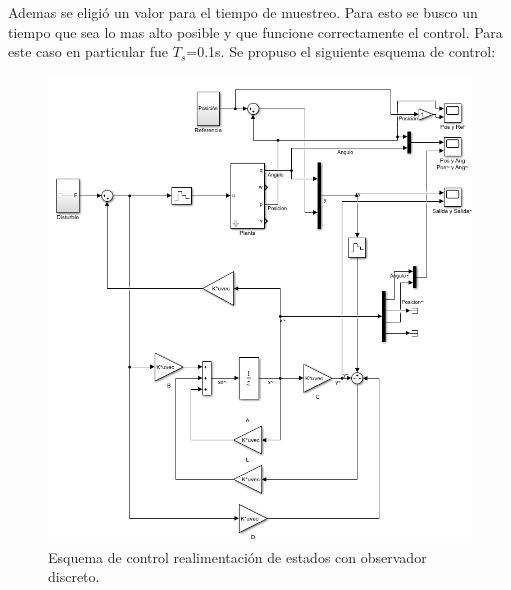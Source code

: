Ademas se eligi\'o un valor para el tiempo de muestreo. Para esto se busco un tiempo que sea lo mas alto posible y que funcione correctamente el control. Para este caso en particular fue $T_s$=0.1s.
Se propuso el siguiente esquema de control:
\begin{figure}[H]
	\centering
	\includegraphics[width=1\linewidth]{Imagenes/Esquema_general_obs_disc.png}
	\caption{Esquema de control realimentación de estados con observador discreto.}
	\label{esqdisctobs}
\end{figure}

